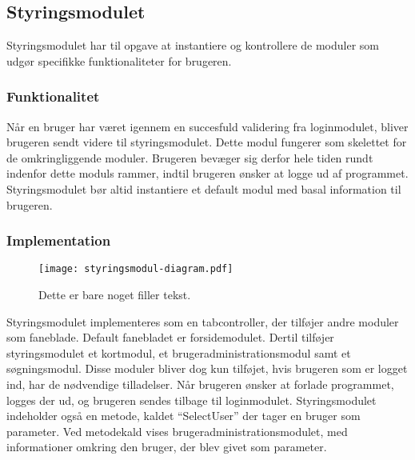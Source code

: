 \subsection{Styringsmodulet}
\label{sub:styringsmodul}

Styringsmodulet har til opgave at instantiere og kontrollere de moduler som udgør specifikke funktionaliteter for brugeren.

\subsubsection{Funktionalitet}
\label{ssub:hovedmodul_funktionalitet}

Når en bruger har været igennem en succesfuld validering fra loginmodulet, bliver brugeren sendt videre til styringsmodulet. Dette modul fungerer som skelettet for de omkringliggende moduler. Brugeren bevæger sig derfor hele tiden rundt indenfor dette moduls rammer, indtil brugeren ønsker at logge ud af programmet. Styringsmodulet bør altid instantiere et default modul med basal information til brugeren.

\subsubsection{Implementation}
\label{ssub:hovedmodul_implementation}

\begin{figure}
  \centering
  \texttt{[image: styringsmodul-diagram.pdf]}
  \caption{Dette er bare noget filler tekst.}
\end{figure}

Styringsmodulet implementeres som en tabcontroller, der tilføjer andre moduler som faneblade. Default fanebladet er forsidemodulet. Dertil tilføjer styringsmodulet et kortmodul, et brugeradministrationsmodul samt et søgningsmodul. Disse moduler bliver dog kun tilføjet, hvis brugeren som er logget ind, har de nødvendige tilladelser. Når brugeren ønsker at forlade programmet, logges der ud, og brugeren sendes tilbage til loginmodulet. Styringsmodulet indeholder også en metode, kaldet \enquote{SelectUser} der tager en bruger som parameter. Ved metodekald vises brugeradministrationsmodulet, med informationer omkring den bruger, der blev givet som parameter. 